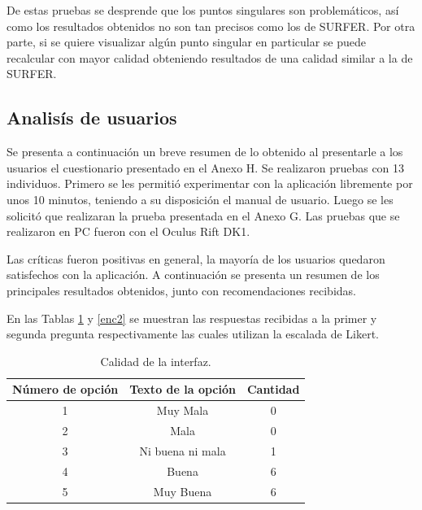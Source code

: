 \documentclass[12pt]{article}
\begin{document}
De estas pruebas se desprende que los puntos singulares son problemáticos, así como los resultados obtenidos no son tan precisos como los de SURFER. Por otra parte, si se quiere visualizar algún punto singular en particular se puede recalcular con mayor calidad obteniendo resultados de una calidad similar a la de SURFER.

\subsection{Analisís de usuarios}
Se presenta a continuación un breve resumen de lo obtenido al presentarle a los usuarios el cuestionario presentado en el Anexo H. Se realizaron pruebas con 13 individuos. Primero se les permitió experimentar con la aplicación libremente por unos 10 minutos, teniendo a su disposición el manual de usuario. Luego se les solicitó que realizaran la prueba presentada en el Anexo G. Las pruebas que se realizaron en PC fueron con el Oculus Rift DK1.

Las críticas fueron positivas en general, la mayoría de los usuarios quedaron satisfechos con la aplicación. A continuación se presenta un resumen de los principales resultados obtenidos, junto con recomendaciones recibidas.

En las Tablas \ref{enc1} y \ref{enc2} se muestran las respuestas recibidas a la primer y segunda pregunta respectivamente las cuales utilizan la escalada de Likert.
\begin{table}[h!]
  \centering
  \begin{tabular}{ccc}
    \toprule
    Número de opción &  Texto de la opción &Cantidad\\
    \midrule
    1 & Muy Mala & 0 \\
    2 & Mala & 0 \\
    3 & Ni buena ni mala & 1 \\
    4 & Buena & 6\\
    5 & Muy Buena & 6\\
    \bottomrule
  \end{tabular}
  \caption{Calidad de la interfaz.}
  \label{enc1}
\end{table}

\end{document}
